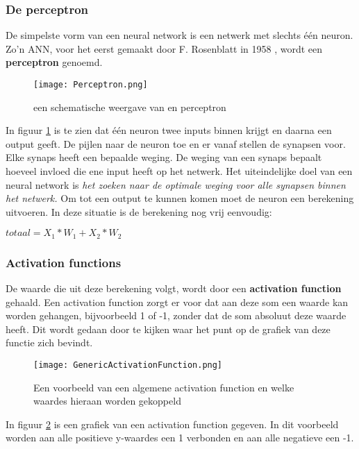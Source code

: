 \subsubsection{De perceptron}
De simpelste vorm van een neural network is een netwerk met slechts \'e\'en neuron. Zo'n ANN, voor het eerst gemaakt door  F. Rosenblatt in 1958 \cite{ANN1}, wordt een \textbf{perceptron} genoemd.

\begin{figure}[H]
  \centering
    \texttt{[image: Perceptron.png]}
  \caption{een schematische weergave van en perceptron}
  \label{fig:perceptron}
\end{figure}

In figuur \ref{fig:perceptron} is te zien dat \'e\'en neuron twee inputs binnen krijgt en daarna een output geeft. De pijlen naar de neuron toe en er vanaf stellen de synapsen voor. Elke synaps heeft een bepaalde weging. De weging van een synaps bepaalt hoeveel invloed die ene input heeft op het netwerk. Het uiteindelijke doel van een neural network is \textit{het zoeken naar de optimale weging voor alle synapsen binnen het netwerk.} 
Om tot een output te kunnen komen moet de neuron een berekening uitvoeren. In deze situatie is de berekening nog vrij eenvoudig:

\begin{center}
$ totaal = X_{1} * W_{1} + X_{2} * W_{2}$
\end{center}

\subsubsection{Activation functions}
\label{fig:ActivationFunction}
De waarde die uit deze berekening volgt, wordt door een \textbf{activation function} gehaald. Een activation function zorgt er voor dat aan deze som een waarde kan worden gehangen, bijvoorbeeld 1 of -1, zonder dat de som absoluut deze waarde heeft. Dit wordt gedaan door te kijken waar het punt op de grafiek van deze functie zich bevindt.

\begin{figure}[H]
  \centering
    \texttt{[image: GenericActivationFunction.png]}
  \caption{Een voorbeeld van een algemene activation function en welke waardes hieraan worden gekoppeld}
  \label{fig:actFunction}
\end{figure}

In figuur \ref{fig:actFunction} is een grafiek van een activation function gegeven. In dit voorbeeld worden aan alle positieve y-waardes een 1 verbonden en aan alle negatieve een -1.

